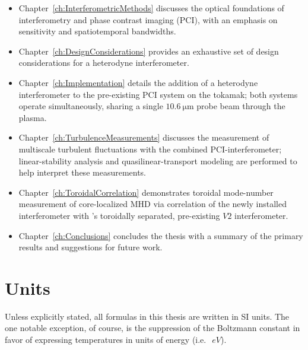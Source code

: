 \begin{itemize}
  \item Chapter~\ref{ch:InterferometricMethods} discusses
    the optical foundations of interferometry and
    phase contrast imaging (PCI),
    with an emphasis on sensitivity and spatiotemporal bandwidths.
  \item Chapter~\ref{ch:DesignConsiderations} provides
    an exhaustive set of design considerations for
    a heterodyne interferometer.
  \item Chapter~\ref{ch:Implementation} details
    the addition of a heterodyne interferometer
    to the pre-existing PCI system on the \diiid\space tokamak;
    both systems operate simultaneously,
    sharing a single $\SI{10.6}{\micro\meter}$ probe beam through the plasma.
  \item Chapter~\ref{ch:TurbulenceMeasurements} discusses
    the measurement of multiscale turbulent fluctuations
    with the combined PCI-interferometer;
    linear-stability analysis and quasilinear-transport modeling
    are performed to help interpret these measurements.
  \item Chapter~\ref{ch:ToroidalCorrelation} demonstrates
    toroidal mode-number measurement of core-localized MHD
    via correlation of the newly installed interferometer
    with \diiid's toroidally separated, pre-existing $V2$ interferometer.
  \item Chapter~\ref{ch:Conclusions} concludes the thesis
    with a summary of the primary results
    and suggestions for future work.
\end{itemize}


\section{Units}
Unless explicitly stated, all formulas in this thesis are written in SI units.
The one notable exception, of course,
is the suppression of the Boltzmann constant
in favor of expressing temperatures in units of energy
(i.e.\ $\SI{}{eV}$).




